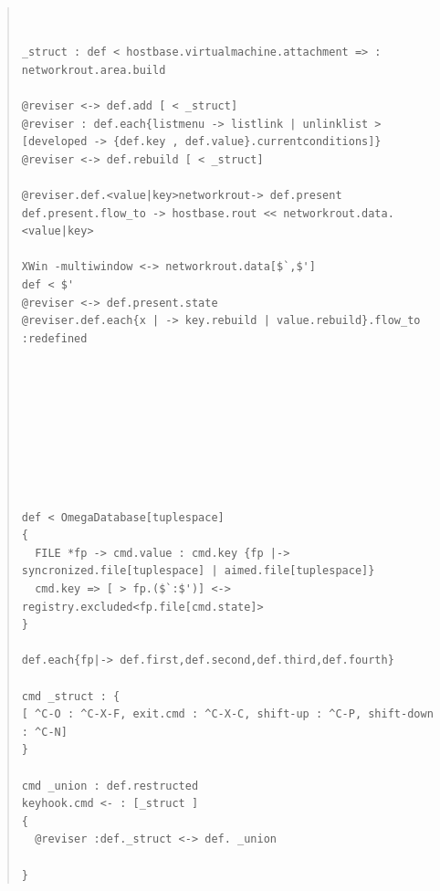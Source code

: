 \documentclass{jsarticle}
\begin{document}
\begin{quote}
\setlength{\baselineskip}{12pt}
\begin{verbatim}


_struct : def < hostbase.virtualmachine.attachment => : networkrout.area.build

@reviser <-> def.add [ < _struct]
@reviser : def.each{listmenu -> listlink | unlinklist > [developed -> {def.key , def.value}.currentconditions]}
@reviser <-> def.rebuild [ < _struct]

@reviser.def.<value|key>networkrout-> def.present
def.present.flow_to -> hostbase.rout << networkrout.data.<value|key>

XWin -multiwindow <-> networkrout.data[$`,$']
def < $'
@reviser <-> def.present.state
@reviser.def.each{x | -> key.rebuild | value.rebuild}.flow_to :redefined









def < OmegaDatabase[tuplespace]
{
  FILE *fp -> cmd.value : cmd.key {fp |-> syncronized.file[tuplespace] | aimed.file[tuplespace]}
  cmd.key => [ > fp.($`:$')] <-> registry.excluded<fp.file[cmd.state]>
}

def.each{fp|-> def.first,def.second,def.third,def.fourth}

cmd _struct : {
[ ^C-O : ^C-X-F, exit.cmd : ^C-X-C, shift-up : ^C-P, shift-down : ^C-N]
}

cmd _union : def.restructed
keyhook.cmd <- : [_struct ]
{
  @reviser :def._struct <-> def. _union

}

\end{verbatim}
\end{quote}
\end{document}
